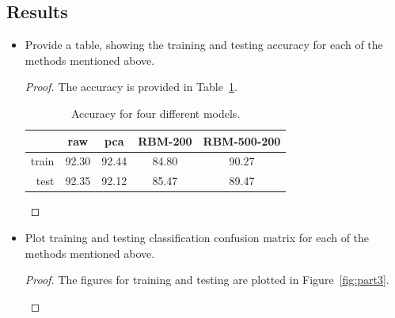 \documentclass[12pt]{article}
\newcommand{\1}{\mathbf{1}}
\begin{document}
{\subsection{Results}
\begin{itemize}
  \item Provide a table, showing the training and testing accuracy for each of the methods mentioned above.
  \begin{proof}
    The accuracy is provided in Table~\ref{tb:part3}.
    \begin{table}[h]
      \centering
      \begin{tabular} {r|c|c|c|c}
        \hline 
        & raw & pca & RBM-200 & RBM-500-200 \\
        \hline
        train & 92.30 & 92.44 & 84.80 & 90.27 \\
        test & 92.35 & 92.12 & 85.47 & 89.47 \\
        \hline
      \end{tabular}
      \caption{Accuracy for four different models.\label{tb:part3} }
    \end{table}
  \end{proof}
  \item Plot training and testing classification confusion matrix for each of the methods mentioned above.
  \begin{proof}
    The figures for training and testing are plotted in Figure~\ref{fig:part3}.
    \begin{figure}[h]
      \centering

\end{figure}
\end{proof}
\end{itemize}}
\end{document}
